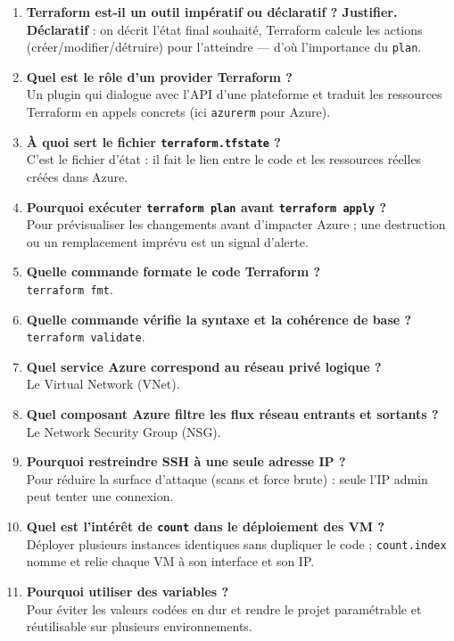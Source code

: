\documentclass[11pt,a4paper]{article}
\newcommand{\code}[1]{\texttt{#1}}
\begin{document}
\begin{enumerate}[leftmargin=2.2em]
\item \textbf{Terraform est-il un outil impératif ou déclaratif ? Justifier.}\\ \textbf{Déclaratif} : on décrit l'état final souhaité, Terraform calcule les actions (créer/modifier/détruire) pour l'atteindre — d'où l'importance du \code{plan}.
\item \textbf{Quel est le rôle d'un provider Terraform ?}\\ Un plugin qui dialogue avec l'API d'une plateforme et traduit les ressources Terraform en appels concrets (ici \code{azurerm} pour Azure).
\item \textbf{À quoi sert le fichier \code{terraform.tfstate} ?}\\ C'est le fichier d'état : il fait le lien entre le code et les ressources réelles créées dans Azure.
\item \textbf{Pourquoi exécuter \code{terraform plan} avant \code{terraform apply} ?}\\ Pour prévisualiser les changements avant d'impacter Azure ; une destruction ou un remplacement imprévu est un signal d'alerte.
\item \textbf{Quelle commande formate le code Terraform ?}\\ \code{terraform fmt}.
\item \textbf{Quelle commande vérifie la syntaxe et la cohérence de base ?}\\ \code{terraform validate}.
\item \textbf{Quel service Azure correspond au réseau privé logique ?}\\ Le Virtual Network (VNet).
\item \textbf{Quel composant Azure filtre les flux réseau entrants et sortants ?}\\ Le Network Security Group (NSG).
\item \textbf{Pourquoi restreindre SSH à une seule adresse IP ?}\\ Pour réduire la surface d'attaque (scans et force brute) : seule l'IP admin peut tenter une connexion.
\item \textbf{Quel est l'intérêt de \code{count} dans le déploiement des VM ?}\\ Déployer plusieurs instances identiques sans dupliquer le code ; \code{count.index} nomme et relie chaque VM à son interface et son IP.
\item \textbf{Pourquoi utiliser des variables ?}\\ Pour éviter les valeurs codées en dur et rendre le projet paramétrable et réutilisable sur plusieurs environnements.

\end{enumerate}
\end{document}
